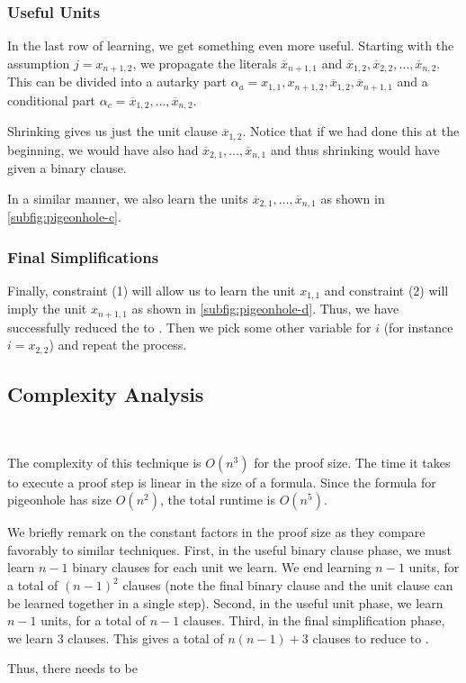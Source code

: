 \subsubsection{Useful Units} In the last row of learning, we get something even more useful. Starting with the assumption $j = x_{n+1, 2}$, we propagate the literals $\overline{x}_{n + 1, 1}$ and $\overline{x}_{1, 2}, \overline{x}_{2, 2}, \ldots, \overline{x}_{n, 2}$.  This can be divided into a autarky part $\alpha_a = x_{1, 1}, x_{n+1, 2}, \overline{x}_{1, 2}, \overline{x}_{n+1, 1}$ and a conditional part $\alpha_c = \overline{x}_{1, 2}, \ldots, \overline{x}_{n, 2}$.

Shrinking gives us just the unit clause $\overline{x}_{1, 2}$. Notice that if we had done this at the beginning, we would have also had $\overline{x}_{2, 1}, \ldots, \overline{x}_{n, 1}$ and thus shrinking would have given a binary clause.

In a similar manner, we also learn the units $\overline{x}_{2, 1}, \ldots, \overline{x}_{n, 1}$ as shown in \autoref{subfig:pigeonhole-c}.

\subsubsection{Final Simplifications} Finally, constraint (1) will allow us to learn the unit $x_{1, 1}$ and constraint (2) will imply the unit $x_{n+1, 1}$ as shown in \autoref{subfig:pigeonhole-d}. Thus, we have successfully reduced the  to . Then we pick some other variable for $i$ (for instance $i = x_{2, 2}$) and repeat the process.

\subsection{Complexity Analysis}~\label{subsec:complexity analysis}

The complexity of this technique is $O(n^3)$ for the proof size. The time it takes to execute a proof step is linear in the size of a formula. Since the formula for pigeonhole has size $O(n^2)$, the total runtime is $O(n^5)$.

We briefly remark on the constant factors in the proof size as they compare favorably to similar techniques. First, in the useful binary clause phase, we must learn $n-1$ binary clauses for each unit we learn. We end learning $n-1$ units, for a total of $(n-1)^2$ clauses (note the final binary clause and the unit clause can be learned together in a single step). Second, in the useful unit phase, we learn $n-1$ units, for a total of $n-1$ clauses. Third, in the final simplification phase, we learn 3 clauses. This gives a total of $n(n-1) + 3$ clauses to reduce  to .

Thus, there needs to be 